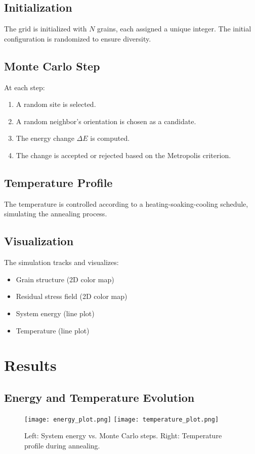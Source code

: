 \documentclass[12pt]{article}
\begin{document}
\subsection{Initialization}
The grid is initialized with $N$ grains, each assigned a unique integer. The initial configuration is randomized to ensure diversity.

\subsection{Monte Carlo Step}
At each step:
\begin{enumerate}
    \item A random site is selected.
    \item A random neighbor's orientation is chosen as a candidate.
    \item The energy change $\Delta E$ is computed.
    \item The change is accepted or rejected based on the Metropolis criterion.
\end{enumerate}

\subsection{Temperature Profile}
The temperature is controlled according to a heating-soaking-cooling schedule, simulating the annealing process.

\subsection{Visualization}
The simulation tracks and visualizes:
\begin{itemize}
    \item Grain structure (2D color map)
    \item Residual stress field (2D color map)
    \item System energy (line plot)
    \item Temperature (line plot)
\end{itemize}

\section{Results}
\subsection{Energy and Temperature Evolution}
\begin{figure}[h!]
    \centering
    \texttt{[image: energy\_plot.png]}
    \texttt{[image: temperature\_plot.png]}
    \caption{Left: System energy vs. Monte Carlo steps. Right: Temperature profile during annealing.}
\end{figure}
\end{document}
